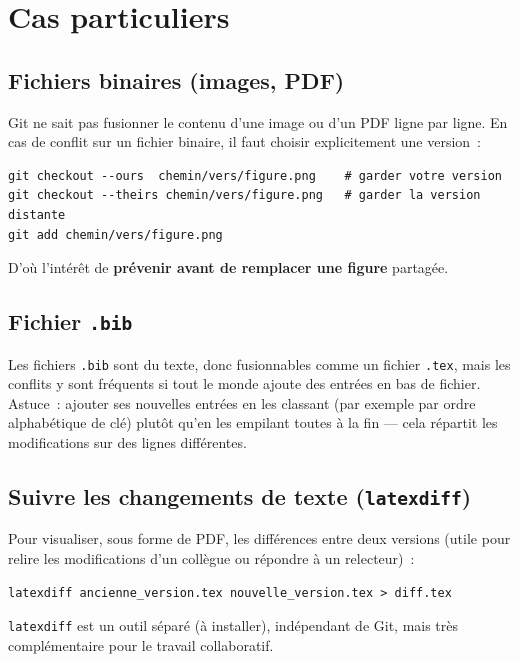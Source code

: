 \documentclass[11pt,a4paper]{article}
\begin{document}
\section{Cas particuliers}

\subsection{Fichiers binaires (images, PDF)}

Git ne sait pas fusionner le contenu d'une image ou d'un PDF ligne par ligne. En cas de conflit sur un fichier binaire, il faut choisir explicitement une version~:

\begin{lstlisting}[style=bashstyle]
git checkout --ours  chemin/vers/figure.png    # garder votre version
git checkout --theirs chemin/vers/figure.png   # garder la version distante
git add chemin/vers/figure.png
\end{lstlisting}

D'où l'intérêt de \textbf{prévenir avant de remplacer une figure} partagée.

\subsection{Fichier \texttt{.bib}}

Les fichiers \texttt{.bib} sont du texte, donc fusionnables comme un fichier \texttt{.tex}, mais les conflits y sont fréquents si tout le monde ajoute des entrées en bas de fichier. Astuce~: ajouter ses nouvelles entrées en les classant (par exemple par ordre alphabétique de clé) plutôt qu'en les empilant toutes à la fin --- cela répartit les modifications sur des lignes différentes.

\subsection{Suivre les changements de texte (\texttt{latexdiff})}

Pour visualiser, sous forme de PDF, les différences entre deux versions (utile pour relire les modifications d'un collègue ou répondre à un relecteur)~:

\begin{lstlisting}[style=bashstyle]
latexdiff ancienne_version.tex nouvelle_version.tex > diff.tex
\end{lstlisting}

\texttt{latexdiff} est un outil séparé (à installer), indépendant de Git, mais très complémentaire pour le travail collaboratif.
\end{document}
